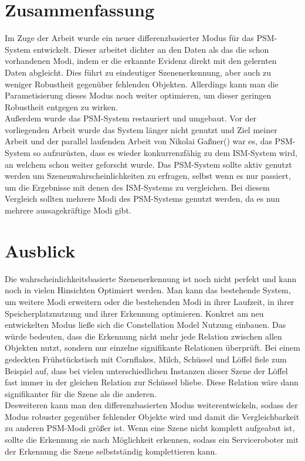 \section{Zusammenfassung}
Im Zuge der Arbeit wurde ein neuer differenzbasierter Modus für das PSM-System entwickelt. Dieser arbeitet dichter an den Daten als das die schon vorhandenen Modi, indem er die erkannte Evidenz direkt mit den gelernten Daten abgleicht. Dies führt zu eindeutiger Szenenerkennung, aber auch zu weniger Robustheit gegenüber fehlenden Objekten. Allerdings kann man die Parametisierung dieses Modus noch weiter optimieren, um dieser geringen Robustheit entgegen zu wirken.\smallskip\\
Außerdem wurde das PSM-System restauriert und umgebaut. Vor der vorliegenden Arbeit wurde das System länger nicht genutzt und Ziel meiner Arbeit und der parallel laufenden Arbeit von Nikolai Gaßner(\cite{gassner17}) war es, das PSM-System so aufzurüsten, dass es wieder konkurrenzfähig zu dem ISM-System wird, an welchem schon weiter geforscht wurde. Das PSM-System sollte aktiv genutzt werden um Szenenwahrscheinlichkeiten zu erfragen, selbst wenn es nur passiert, um die Ergebnisse mit denen des ISM-Systems zu vergleichen. Bei diesem Vergleich sollten mehrere Modi des PSM-Systems genutzt werden, da es nun mehrere aussagekräftige Modi gibt.\smallskip\\
\section{Ausblick}
Die wahrscheinlichkeitsbasierte Szenenerkennung ist noch nicht perfekt und kann noch in vielen Hinsichten Optimiert werden. Man kann das bestehende System, um weitere Modi erweitern oder die bestehenden Modi in ihrer Laufzeit, in ihrer Speicherplatznutzung und ihrer Erkennung optimieren. Konkret am neu entwickelten Modus ließe sich die Constellation Model Nutzung einbauen. Das würde bedeuten, dass die Erkennung nicht mehr jede Relation zwischen allen Objekten nutzt, sondern nur einzelne signifikante Relationen überprüft. Bei einem gedeckten Frühstückstisch mit Cornflakes, Milch, Schüssel und Löffel fiele zum Beispiel auf, dass bei vielen unterschiedlichen Instanzen dieser Szene der Löffel fast immer in der gleichen Relation zur Schüssel bliebe. Diese Relation wäre dann signifikanter für die Szene als die anderen.\smallskip\\
Desweiteren kann man den differenzbasierten Modus weiterentwickeln, sodass der Modus robuster gegenüber fehlender Objekte wird und damit die Vergleichbarkeit zu anderen PSM-Modi größer ist. Wenn eine Szene nicht komplett aufgeabut ist, sollte die Erkennung sie nach Möglichkeit erkennen, sodass ein Serviceroboter mit der Erkennung die Szene selbstständig komplettieren kann.

